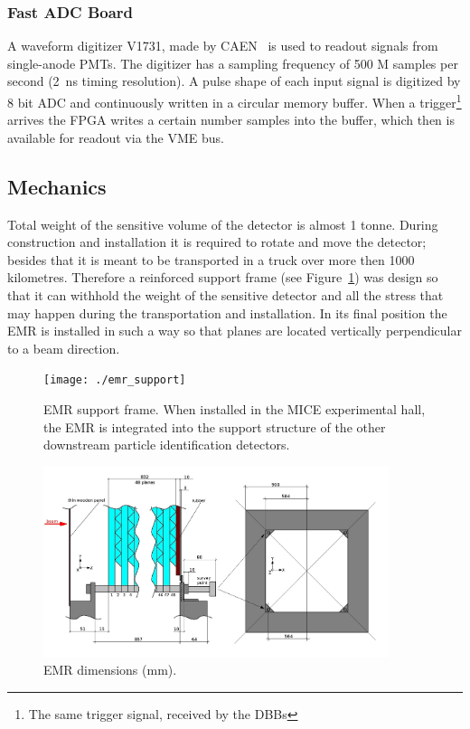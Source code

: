 \documentclass[a4paper,11pt]{article}
\begin{document}
\subsubsection{Fast ADC Board}\label{electronics:subsec:fast_adc_board}

A waveform digitizer V1731, made by CAEN~\cite{V1731} is used to readout signals from single-anode PMTs. The digitizer has a sampling frequency of 500 M
samples per second (2~ns timing resolution). A pulse shape of each input signal is digitized by 8 bit ADC and continuously written in a circular memory
buffer. When a trigger\footnote{The same trigger signal, received by the DBBs} arrives the FPGA writes a certain number samples into the buffer, which
then is available for readout via the VME bus.

\subsection{Mechanics}\label{design:subsec:mechanics}

Total weight of the sensitive volume of the detector is almost 1 tonne. During construction and installation it is required to rotate and move the detector;
besides that it is meant to be transported in a truck over more then 1000 kilometres. Therefore a reinforced support frame (see Figure~\ref{fig:emr_support})
was design so that it can withhold the weight of the sensitive detector and all the stress that may happen during the transportation and installation. In its
final position the EMR is installed in such a way so that planes are located vertically perpendicular to a beam direction. 

\begin{figure}[htp!]
 \centering 
 \texttt{[image: ./emr\_support]}
 \caption[EMR support frame]{EMR support frame. When installed in the MICE experimental hall, the EMR is integrated into the support structure of the other 
 downstream particle identification detectors.}
 \label{fig:emr_support}
\end{figure}

\begin{figure}[htp!]
 \centering
 \includegraphics[width=0.9\textwidth]{./internal_dimensions}
 \caption[EMR dimensions]{EMR dimensions (mm).}
 \label{fig:internal_dimensions}
\end{figure}
\end{document}
